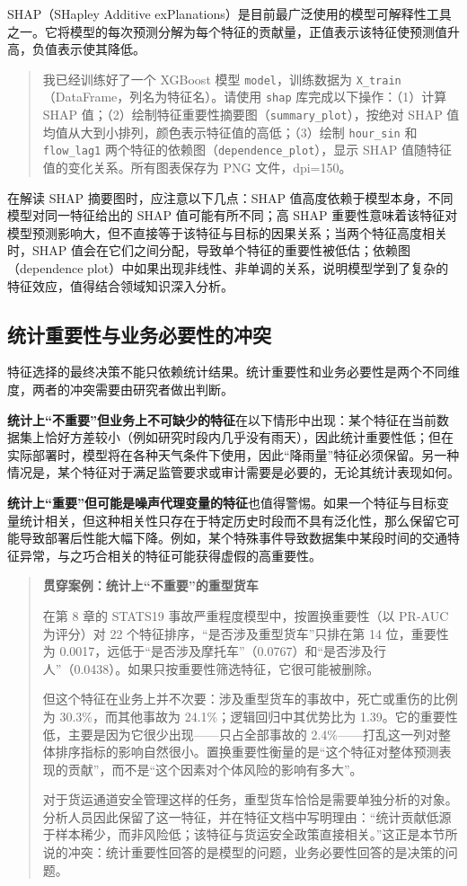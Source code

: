 SHAP（SHapley Additive exPlanations）是目前最广泛使用的模型可解释性工具之一。它将模型的每次预测分解为每个特征的贡献量，正值表示该特征使预测值升高，负值表示使其降低。

\begin{quote}
我已经训练好了一个 XGBoost 模型 \texttt{model}，训练数据为 \texttt{X\_train}（DataFrame，列名为特征名）。请使用 \texttt{shap} 库完成以下操作：（1）计算 SHAP 值；（2）绘制特征重要性摘要图（\texttt{summary\_plot}），按绝对 SHAP 值均值从大到小排列，颜色表示特征值的高低；（3）绘制 \texttt{hour\_sin} 和 \texttt{flow\_lag1} 两个特征的依赖图（\texttt{dependence\_plot}），显示 SHAP 值随特征值的变化关系。所有图表保存为 PNG 文件，dpi=150。
\end{quote}

在解读 SHAP 摘要图时，应注意以下几点：SHAP 值高度依赖于模型本身，不同模型对同一特征给出的 SHAP 值可能有所不同；高 SHAP 重要性意味着该特征对模型预测影响大，但不直接等于该特征与目标的因果关系；当两个特征高度相关时，SHAP 值会在它们之间分配，导致单个特征的重要性被低估；依赖图（dependence plot）中如果出现非线性、非单调的关系，说明模型学到了复杂的特征效应，值得结合领域知识深入分析。

\subsection{统计重要性与业务必要性的冲突}

特征选择的最终决策不能只依赖统计结果。统计重要性和业务必要性是两个不同维度，两者的冲突需要由研究者做出判断。

\textbf{统计上“不重要”但业务上不可缺少的特征}在以下情形中出现：某个特征在当前数据集上恰好方差较小（例如研究时段内几乎没有雨天），因此统计重要性低；但在实际部署时，模型将在各种天气条件下使用，因此“降雨量”特征必须保留。另一种情况是，某个特征对于满足监管要求或审计需要是必要的，无论其统计表现如何。

\textbf{统计上“重要”但可能是噪声代理变量的特征}也值得警惕。如果一个特征与目标变量统计相关，但这种相关性只存在于特定历史时段而不具有泛化性，那么保留它可能导致部署后性能大幅下降。例如，某个特殊事件导致数据集中某段时间的交通特征异常，与之巧合相关的特征可能获得虚假的高重要性。

\begin{quote}
\textbf{贯穿案例：统计上“不重要”的重型货车}

在第 8 章的 STATS19 事故严重程度模型中，按置换重要性（以 PR-AUC 为评分）对 22 个特征排序，“是否涉及重型货车”只排在第 14 位，重要性为 0.0017，远低于“是否涉及摩托车”（0.0767）和“是否涉及行人”（0.0438）。如果只按重要性筛选特征，它很可能被删除。

但这个特征在业务上并不次要：涉及重型货车的事故中，死亡或重伤的比例为 30.3\%，而其他事故为 24.1\%；逻辑回归中其优势比为 1.39。它的重要性低，主要是因为它很少出现——只占全部事故的 2.4\%——打乱这一列对整体排序指标的影响自然很小。置换重要性衡量的是“这个特征对整体预测表现的贡献”，而不是“这个因素对个体风险的影响有多大”。

对于货运通道安全管理这样的任务，重型货车恰恰是需要单独分析的对象。分析人员因此保留了这一特征，并在特征文档中写明理由：“统计贡献低源于样本稀少，而非风险低；该特征与货运安全政策直接相关。”这正是本节所说的冲突：统计重要性回答的是模型的问题，业务必要性回答的是决策的问题。
\end{quote}

